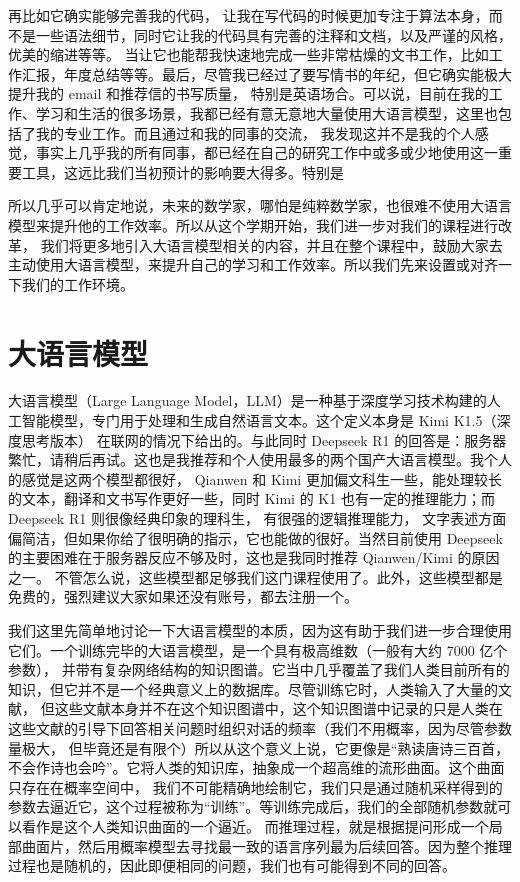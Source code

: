 \documentclass{ctexbook}
\numberwithin{theorem}{chapter}
\begin{document}
再比如它确实能够完善我的代码，
让我在写代码的时候更加专注于算法本身，而不是一些语法细节，同时它让我的代码具有完善的注释和文档，以及严谨的风格，优美的缩进等等。
当让它也能帮我快速地完成一些非常枯燥的文书工作，比如工作汇报，年度总结等等。最后，尽管我已经过了要写情书的年纪，但它确实能极大提升我的 email 和推荐信的书写质量，
特别是英语场合。可以说，目前在我的工作、学习和生活的很多场景，我都已经有意无意地大量使用大语言模型，这里也包括了我的专业工作。而且通过和我的同事的交流，
我发现这并不是我的个人感觉，事实上几乎我的所有同事，都已经在自己的研究工作中或多或少地使用这一重要工具，这远比我们当初预计的影响要大得多。特别是

所以几乎可以肯定地说，未来的数学家，哪怕是纯粹数学家，也很难不使用大语言模型来提升他的工作效率。所以从这个学期开始，我们进一步对我们的课程进行改革，
我们将更多地引入大语言模型相关的内容，并且在整个课程中，鼓励大家去主动使用大语言模型，来提升自己的学习和工作效率。所以我们先来设置或对齐一下我们的工作环境。

\section{大语言模型}
大语言模型（Large Language Model，LLM）是一种基于深度学习技术构建的人工智能模型，专门用于处理和生成自然语言文本。这个定义本身是 Kimi K1.5（深度思考版本）
在联网的情况下给出的。与此同时 Deepseek R1 的回答是：服务器繁忙，请稍后再试。这也是我推荐和个人使用最多的两个国产大语言模型。我个人的感觉是这两个模型都很好，
Qianwen 和 Kimi 更加偏文科生一些，能处理较长的文本，翻译和文书写作更好一些，同时 Kimi 的 K1 也有一定的推理能力；而 Deepseek R1 则很像经典印象的理科生，
有很强的逻辑推理能力，
文字表述方面偏简洁，但如果你给了很明确的指示，它也能做的很好。当然目前使用 Deepseek 的主要困难在于服务器反应不够及时，这也是我同时推荐 Qianwen/Kimi 的原因之一。
不管怎么说，这些模型都足够我们这门课程使用了。此外，这些模型都是免费的，强烈建议大家如果还没有账号，都去注册一个。

我们这里先简单地讨论一下大语言模型的本质，因为这有助于我们进一步合理使用它们。一个训练完毕的大语言模型，是一个具有极高维数（一般有大约 7000 亿个参数），
并带有复杂网络结构的知识图谱。它当中几乎覆盖了我们人类目前所有的知识，但它并不是一个经典意义上的数据库。尽管训练它时，人类输入了大量的文献，
但这些文献本身并不在这个知识图谱中，这个知识图谱中记录的只是人类在这些文献的引导下回答相关问题时组织对话的频率（我们不用概率，因为尽管参数量极大，
但毕竟还是有限个）所以从这个意义上说，它更像是“熟读唐诗三百首，不会作诗也会吟”。它将人类的知识库，抽象成一个超高维的流形曲面。这个曲面只存在在概率空间中，
我们不可能精确地绘制它，我们只是通过随机采样得到的参数去逼近它，这个过程被称为“训练”。等训练完成后，我们的全部随机参数就可以看作是这个人类知识曲面的一个逼近。
而推理过程，就是根据提问形成一个局部曲面片，然后用概率模型去寻找最一致的语言序列最为后续回答。因为整个推理过程也是随机的，因此即便相同的问题，我们也有可能得到不同的回答。
\end{document}

